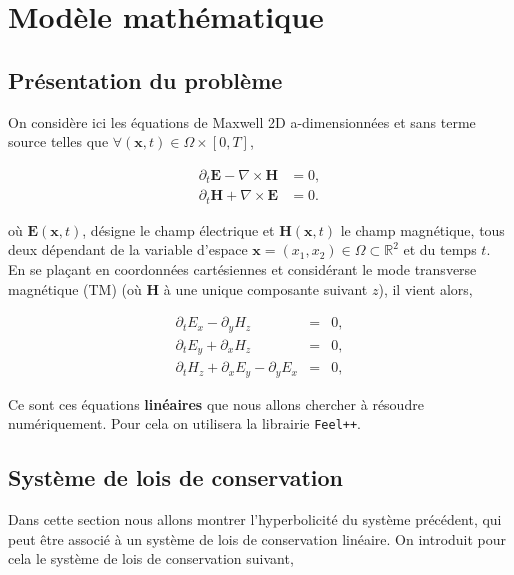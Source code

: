 \documentclass[a4paper,oneside,10pt]{report}
\begin{document}
\chapter{Modèle mathématique}
\section{Présentation du problème}
On considère ici les équations de Maxwell 2D a-dimensionnées et sans terme source telles que $\forall (\mathbf{x},t) \in \Omega \times [0,T]$,


\begin{equation}
\begin{aligned}
\label{eq:1}
\partial_t \mathbf{E} - \nabla \times \mathbf{H} &= 0,\\
\partial_t \mathbf{H} + \nabla \times \mathbf{E} &= 0.
\end{aligned}
\end{equation}

où $\mathbf{E}(\mathbf{x},t)$, désigne le champ électrique et $\mathbf{H}(\mathbf{x},t)$ le champ magnétique, tous deux dépendant de la variable d'espace $\mathbf{x}=(x_1,x_2)\in \Omega \subset \mathbb{R}^2$ et du temps $t$.\\


En se plaçant en coordonnées cartésiennes et considérant le mode transverse magnétique (TM) (où $\mathbf{H}$ à une unique composante suivant $z$), il vient alors,

\begin{eqnarray}
\partial_t E_x - \partial_y H_z  &=& 0, \label{eq:2a}\\
\partial_t E_y + \partial_x H_z &=& 0, \label{eq:2b}\\
\partial_t H_z + \partial_x E_y - \partial_y E_x &=& 0, \label{eq:2c}
\end{eqnarray}



Ce sont ces équations \textbf{linéaires} que nous allons chercher à résoudre numériquement. Pour cela on utilisera la librairie \texttt{Feel++}.

\section{Système de lois de conservation}
Dans cette section nous allons montrer l'hyperbolicité du système précédent, qui peut être associé à un système de lois de conservation linéaire. On introduit pour cela le système de lois de conservation suivant,
\end{document}
